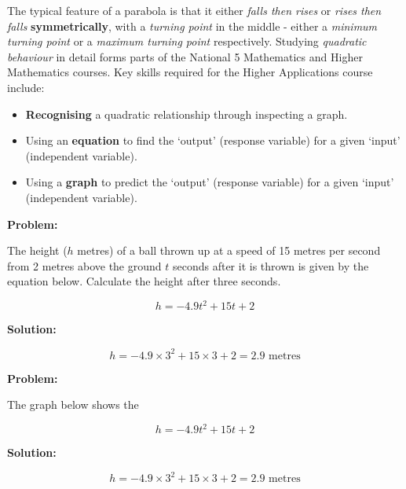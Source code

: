 \documentclass[
  11pt,
  openany]{book}
\begin{document}
\vspace{-0.2cm}

The typical feature of a parabola is that it either \emph{falls then rises} or \emph{rises then falls} \textbf{symmetrically}, with a \emph{turning point} in the middle - either a \emph{minimum turning point} or a \emph{maximum turning point} respectively. Studying \emph{quadratic behaviour} in detail forms parts of the National 5 Mathematics and Higher Mathematics courses. Key skills required for the Higher Applications course include:

\begin{itemize}[leftmargin=2cm]
    \item \textbf{Recognising} a quadratic relationship through inspecting a graph.
    \item Using an \textbf{equation} to find the `output' (response variable) for a given `input' (independent variable). 
    \item Using a \textbf{graph} to predict the `output' (response variable) for a given `input' (independent variable). 
\end{itemize}

\begin{tcolorbox}[title=Example,colback=RoyalBlue!1!,colframe=NavyBlue]
\textbf{Problem:}

The height ($h$ metres) of a ball thrown up at a speed of 15 metres per second from 2 metres above the ground $t$ seconds after it is thrown is given by the equation below. Calculate the height after three seconds.

\vspace{-0.2cm}

\[h=-\text{4.9}t^{\text{2}}+\text{15}t+\text{2}\]

\tcblower
\textbf{Solution:}

\vspace{-0.2cm}

\[h=-\text{4.9}\times \text{3}^2 + \text{15}\times\text{3}+\text{2}=\text{2.9 metres}\]

\end{tcolorbox}

\begin{tcolorbox}[title=Example,colback=RoyalBlue!1!,colframe=NavyBlue,sidebyside]
\textbf{Problem:}

The graph below shows the 

\vspace{-0.2cm}

\[h=-\text{4.9}t^{\text{2}}+\text{15}t+\text{2}\]

\tcblower
\textbf{Solution:}

\vspace{-0.2cm}

\[h=-\text{4.9}\times \text{3}^2 + \text{15}\times\text{3}+\text{2}=\text{2.9 metres}\]

\end{tcolorbox}
\end{document}
